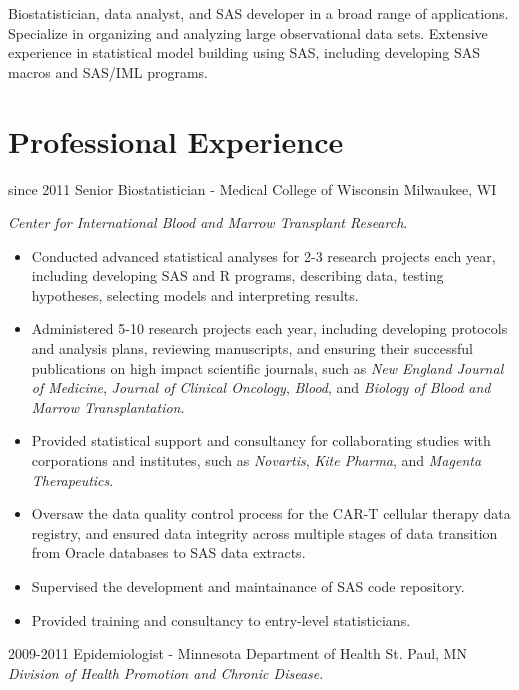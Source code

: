 Biostatistician, data analyst, and SAS developer in a broad range of applications. Specialize in organizing and analyzing large observational data sets. Extensive experience in statistical model building using SAS, including developing SAS macros and SAS/IML programs.\\

\section{Professional Experience}

\begin{entrylist}
  \entry
    {since 2011}
    {Senior Biostatistician - Medical College of Wisconsin}
    {Milwaukee, WI}
    {
    \textit{Center for International Blood and Marrow Transplant Research}.
    \begin{itemize}
      \item Conducted advanced statistical analyses for 2-3 research projects each year, including developing SAS and R programs, describing data, testing hypotheses, selecting models and interpreting results.
      \item Administered 5-10 research projects each year, including developing protocols and analysis plans, reviewing manuscripts, and ensuring their successful publications on high impact scientific journals, such as \textit{New England Journal of Medicine}, \textit{Journal of Clinical Oncology}, \textit{Blood}, and \textit{Biology of Blood and Marrow Transplantation}.
      \item Provided statistical support and consultancy for collaborating studies with corporations and institutes, such as \textit{Novartis}, \textit{Kite Pharma}, and \textit{Magenta Therapeutics}.
      \item Oversaw the data quality control process for the CAR-T cellular therapy data registry, and ensured data integrity across multiple stages of data transition from Oracle databases to SAS data extracts.
      \item Supervised the development and maintainance of SAS code repository.
      \item Provided training and consultancy to entry-level statisticians.
    \end{itemize}
    }
  \entry
    {2009-2011}
    {Epidemiologist - Minnesota Department of Health}
    {St. Paul, MN}
    {
    \textit{Division of Health Promotion and Chronic Disease}.
}
\end{entrylist}
